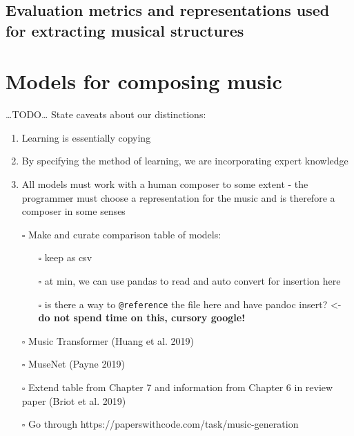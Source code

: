 \documentclass[12pt,a4paper,]{report}
\providecommand{\tightlist}{%
  \setlength{\itemsep}{0pt}\setlength{\parskip}{0pt}}
\begin{document}
\hypertarget{evaluation-metrics-and-representations-used-for-extracting-musical-structures}{%
\subsection{Evaluation metrics and representations used for extracting
musical
structures}\label{evaluation-metrics-and-representations-used-for-extracting-musical-structures}}

\hypertarget{models-for-composing-music}{%
\section{Models for composing music}\label{models-for-composing-music}}

\ldots TODO\ldots{} State caveats about our distinctions:

\begin{enumerate}
\def\labelenumi{\arabic{enumi}.}
\tightlist
\item
  Learning is essentially copying
\item
  By specifying the method of learning, we are incorporating expert
  knowledge
\item
  All models must work with a human composer to some extent - the
  programmer must choose a representation for the music and is therefore
  a composer in some senses
\end{enumerate}

\begin{itemize}
\tightlist
\item[$\square$]
  Make and curate comparison table of models:

  \begin{itemize}
  \tightlist
  \item[$\square$]
    keep as csv
  \item[$\square$]
    at min, we can use pandas to read and auto convert for insertion
    here
  \item[$\square$]
    is there a way to \texttt{@reference} the file here and have pandoc
    insert? \textless- \textbf{do not spend time on this, cursory
    google!}
  \end{itemize}
\item[$\square$]
  Music Transformer (Huang et al. 2019)
\item[$\square$]
  MuseNet (Payne 2019)
\item[$\square$]
  Extend table from Chapter 7 and information from Chapter 6 in review
  paper (Briot et al. 2019)
\item[$\square$]
  Go through https://paperswithcode.com/task/music-generation
\end{itemize}
\end{document}
